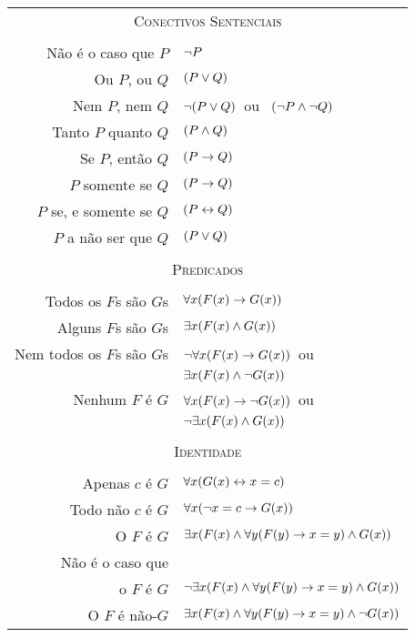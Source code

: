 \begin{center}
\begin{tabular*}{\textwidth}{rl}
\multicolumn{2}{c}{\textsc{Conectivos Sentenciais}}\\ \\
Não é o caso que $P$ & $\neg P$\\
Ou $P$, ou $Q$ & $(P \vee Q)$\\
Nem $P$, nem $Q$ & $\neg(P \vee Q)$\ ou \ $(\neg P \wedge \neg Q)$\\
Tanto $P$ quanto $Q$ & $(P \wedge Q)$\\
Se $P$, então $Q$ & $(P \rightarrow Q)$\\
$P$ somente se $Q$ & $(P \rightarrow Q)$\\
$P$ se, e somente se $Q$ & $(P \leftrightarrow Q)$\\
$P$ a não ser que $Q$ & $(P \vee Q)$\\
\\
\multicolumn{2}{c}{\label{SymbolizingPredicates}\textsc{Predicados}}\\ \\
Todos os $F$s são $G$s & $\forall x(\mathord{F}(x) \rightarrow \mathord{G}(x))$\\
Alguns $F$s são $G$s & $\exists x(\mathord{F}(x) \wedge \mathord{G}(x))$\\
Nem todos os $F$s são $G$s & $\neg\forall x(\mathord{F}(x) \rightarrow \mathord{G}(x))$\ ou\\
& $\exists x(\mathord{F}(x) \wedge \neg \mathord{G}(x))$\\
Nenhum $F$ é $G$ & $\forall x(\mathord{F}(x) \rightarrow\neg \mathord{G}(x))$\ ou\\
& $\neg\exists x(\mathord{F}(x) \wedge \mathord{G}(x))$\\
\\
\multicolumn{2}{c}{\textsc{Identidade}}\\ \\
Apenas $c$ é $G$ & $\forall x(\mathord{G}(x) \leftrightarrow x=c)$\\
Todo não $c$ é $G$ & $\forall x(\neg x = c \rightarrow \mathord{G}(x) )$\\
O $F$ é $G$ & $\exists x(\mathord{F}(x) \wedge \forall y(\mathord{F}(y) \rightarrow x=y) \wedge \mathord{G}(x) )$\\
Não é o caso que\\
 o $F$ é $G$ & $\neg\exists x(\mathord{F}(x) \wedge \forall y(\mathord{F}(y) \rightarrow x=y) \wedge \mathord{G}(x) )$\\
O $F$ é não-$G$ & $\exists x(\mathord{F}(x) \wedge \forall y(\mathord{F}(y) \rightarrow x=y) \wedge \neg \mathord{G}(x) )$
\end{tabular*}
\end{center}




